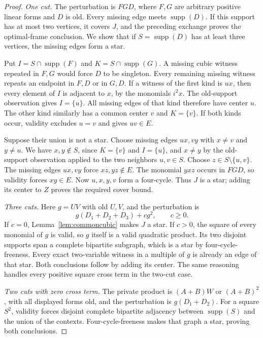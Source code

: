 \documentclass[11pt]{article}
\newcommand{\supp}{\operatorname{supp}}
\theoremstyle{definition}
\theoremstyle{remark}
\begin{document}
\begin{proof}
\emph{One cut.} The perturbation is $FGD$, where $F,G$ are arbitrary positive linear forms and $D$ is old. Every missing edge meets $\supp(D)$. If this support has at most two vertices, it covers $J$, and the preceding exchange proves the optimal-frame conclusion. We show that if $S=\supp(D)$ has at least three vertices, the missing edges form a star.

Put $I=S\cap\supp(F)$ and $K=S\cap\supp(G)$. A missing cubic witness repeated in $F,G$ would force $D$ to be singleton. Every remaining missing witness repeats an endpoint in $F,D$ or in $G,D$. If a witness of the first kind is $ux$, then every element of $I$ is adjacent to $x$, by the monomials $i^2x$. The old-support observation gives $I=\{u\}$. All missing edges of that kind therefore have center $u$. The other kind similarly has a common center $v$ and $K=\{v\}$. If both kinds occur, validity excludes $u=v$ and gives $uv\in E$.

Suppose their union is not a star. Choose missing edges $ux,vy$ with $x\ne v$ and $y\ne u$. We have $x,y\notin S$, since $K=\{v\}$ and $I=\{u\}$, and $x\ne y$ by the old-support observation applied to the two neighbors $u,v\in S$. Choose $z\in S\setminus\{u,v\}$. The missing edges $ux,vy$ force $xz,yz\notin E$. The monomial $yxz$ occurs in $FGD$, so validity forces $xy\in E$. Now $u,x,y,v$ form a four-cycle. Thus $J$ is a star; adding its center to $Z$ proves the required cover bound.

\emph{Three cuts.} Here $g=UV$ with old $U,V$, and the perturbation is
\[
 g(D_1+D_2+D_3)+c g^2,\qquad c\ge0.
\]
If $c=0$, Lemma~\ref{lem:commoncubic} makes $J$ a star. If $c>0$, the square of every monomial of $g$ is valid, so $g$ itself is a valid quadratic product. Its two disjoint supports span a complete bipartite subgraph, which is a star by four-cycle-freeness. Every exact two-variable witness in a multiple of $g$ is already an edge of that star. Both conclusions follow by adding its center. The same reasoning handles every positive square cross term in the two-cut case.

\emph{Two cuts with zero cross term.} The private product is $(A+B)W$ or $(A+B)^2$, with all displayed forms old, and the perturbation is $g(D_1+D_2)$. For a square $S^2$, validity forces disjoint complete bipartite adjacency between $\supp(S)$ and the union of the contexts. Four-cycle-freeness makes that graph a star, proving both conclusions.


\end{proof}
\end{document}
